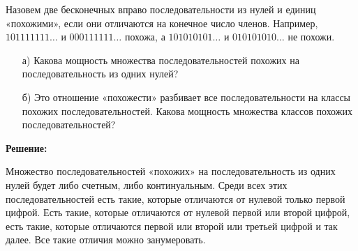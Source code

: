 \documentclass[12pt, a4paper, oneside]{article}
\begin{document}



\begin{problem}{}
Назовем две бесконечных вправо последовательности из нулей и единиц «похожими», если они отличаются на конечное число членов. Например, $101111111 \ldots$ и $000111111 \ldots$ похожа, а $101010101 \ldots$ и $010101010 \ldots$ не похожи.
    \begin{enumerate}
        \item[а)] Какова мощность множества последовательностей похожих на последовательность из одних нулей?
        \item[б)] Это отношение «похожести» разбивает все последовательности на классы похожих последовательностей. Какова мощность множества классов похожих последовательностей?
    \end{enumerate}
\end{problem}

\textbf{Решение:}

Множество последовательностей «похожих» на последовательность из одних нулей будет либо счетным, либо континуальным. Среди всех этих последовательностей есть такие, которые отличаются от нулевой только первой цифрой. Есть такие, которые отличаются от нулевой первой или второй цифрой, есть такие, которые отличаются первой или второй или третьей цифрой и так далее. Все такие отличия можно занумеровать.
\end{document}
